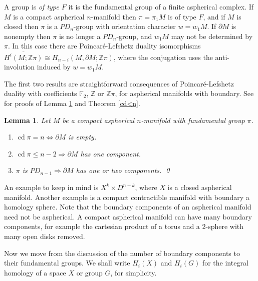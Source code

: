 \documentclass[12pt]{amsart}
\renewcommand{\leq}{\leqslant}
\newtheorem{lemma}[theorem]{Lemma}
\theoremstyle{definition}
\newcommand{\Z}{\mathbb Z}
\DeclareMathOperator{\cd}{cd}
\begin{document}
A  group is {\em of type $F$} it is the fundamental group of a finite aspherical complex.
If $M$ is a compact aspherical $n$-manifold then $\pi=\pi_1M$ is of type $F$, 
and if $M$ is closed then $\pi$  is a $PD_n$-group with orientation character $w=w_1M$.
If $\partial{M}$ is nonempty then $\pi$ is no longer a $PD_n$-group, 
and $w_1M$ may not be determined by $\pi$.
In this case there are Poincar\'e-Lefshetz duality isomorphisms
$\overline{H^i(M;\Z\pi)}\cong{H_{n-i}(M,\partial{M};\Z\pi)}$,
where the conjugation uses the anti-involution induced by $w=w_1M$.


The first two results are straightforward consequences of Poincar\'e-Lefshetz duality 
with coefficients $\mathbb{F}_2$,  $\Z$ or $\Z\pi$,
for aspherical manifolds with boundary.
See \cite{dh3} for proofs of Lemma \ref{components of boundary}
and Theorem \ref{cd<n}.

\begin{lemma} \label{components of boundary}
Let $M$ be a compact aspherical $n$-manifold with fundamental group $\pi$.
\label{boundary components}
\begin{enumerate}
\item \label{cdpin} $\cd \pi =n \Longleftrightarrow \partial M$ is empty.
\item \label{cdpin-2}$\cd \pi \leq{n-2} \Longrightarrow \partial M$ has one component.
\item \label{pdn-1} $ \pi$ is $PD_{n-1} \Longrightarrow \partial M$ has one or two components.
\qed
\end{enumerate}
\end{lemma}

An example to keep in mind is $X^k\times D^{n-k}$, where $X$ is a closed aspherical manifold.      
Another example is a compact contractible manifold with boundary 
a homology sphere.   
Note that the boundary components of an aspherical manifold need not be aspherical.   
A compact aspherical manifold can have many boundary components, 
for example the cartesian product of 
a torus and a 2-sphere with many open disks removed.

Now we move from the discussion of the number of boundary components to 
their fundamental groups. 
We shall write $H_i(X)$ and $H_i(G)$ for the integral homology of a space $X$ or group $G$, for simplicity.
\end{document}
